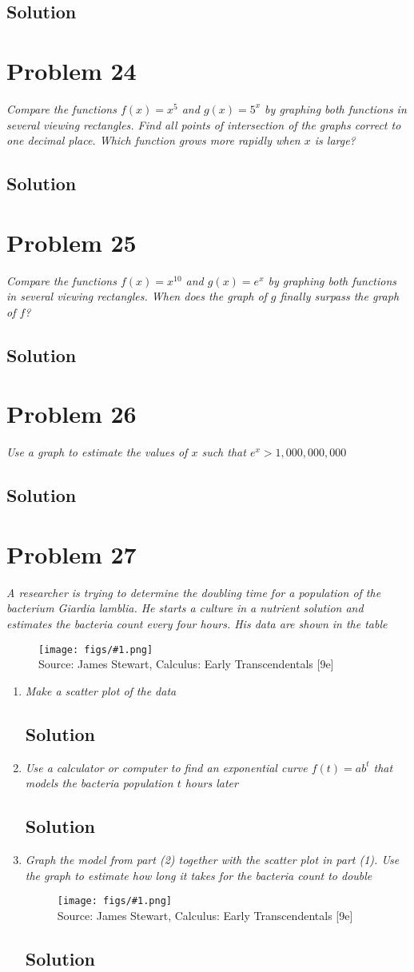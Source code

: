 \documentclass[11pt]{article}
\newcommand{\soln}{\subsection*}
\newcommand{\qn}{\textit}
\newcommand{\imagesource}[1]{{\footnotesize Source: #1}}
\newcommand{\imgqn}[1]{
	\begin{figure}[H]
		\centering
		\texttt{[image: figs/\#1.png]}\\
		\imagesource{James Stewart, Calculus: Early Transcendentals [9e]}
	\end{figure}
}
\begin{document}
\soln{Solution}

\section*{Problem 24}

\qn{Compare the functions $f(x)=x^5$ and $g(x)=5^x$ by graphing both functions in several viewing rectangles. Find all points of intersection of the graphs correct to one decimal place. Which function grows more rapidly when $x$ is large?}

\soln{Solution}

\section*{Problem 25}

\qn{Compare the functions $f(x)=x^{10}$ and $g(x)=e^x$ by graphing both functions in several viewing rectangles. When does the graph of $g$ finally surpass the graph of $f$?}

\soln{Solution}

\section*{Problem 26}

\qn{Use a graph to estimate the values of $x$ such that $e^x > 1,000,000,000$}

\soln{Solution}

\section*{Problem 27}

\qn{A researcher is trying to determine the doubling time for a population of the bacterium \textit{Giardia lamblia}. He starts a culture in a nutrient solution and estimates the bacteria count every four hours. His data are shown in the table}
\imgqn{1.4.27}

\begin{enumerate}
	\item \qn{Make a scatter plot of the data}
	\soln{Solution}
	
	\item \qn{Use a calculator or computer to find an exponential curve $f(t)=ab^t$ that models the bacteria population $t$ hours later}
	\soln{Solution}
	
	\item \qn{Graph the model from part (2) together with the scatter plot in part (1). Use the graph to estimate how long it takes for the bacteria count to double}
	\imgqn{1.4.27.c}
	\soln{Solution}
\end{enumerate}
\end{document}
